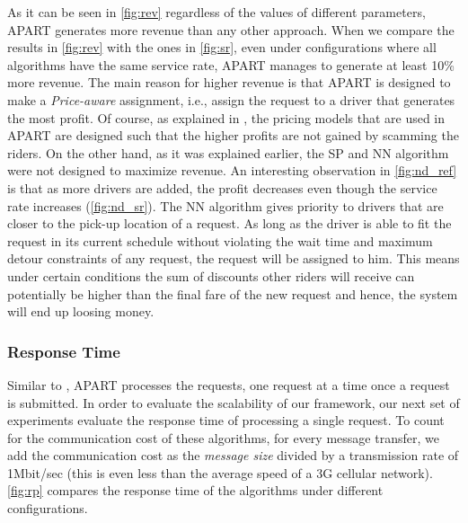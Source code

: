 As it can be seen in \cref{fig:rev} regardless of the values of different parameters, APART generates more revenue than any other approach. When we compare the results in \cref{fig:rev} with the ones in \cref{fig:sr}, even under configurations where all algorithms have the same service rate, APART manages to generate at least 10\% more revenue. The main reason for higher revenue is that APART is designed to make a \textit{Price-aware} assignment, i.e., assign the request to a driver that generates the most profit. Of course, as explained in , the pricing models that are used in APART are designed such that the higher profits are not gained by scamming the riders. On the other hand, as it was explained earlier, the SP and NN algorithm were not designed to maximize revenue. An interesting observation in \cref{fig:nd_ref} is that as more drivers are added, the profit decreases even though the service rate increases (\cref{fig:nd_sr}). The NN algorithm gives priority to drivers that are closer to the pick-up location of a request. As long as the driver is able to fit the request in its current schedule without violating the wait time and maximum detour constraints of any request, the request will be assigned to him. This means under certain conditions the sum of discounts other riders will receive can potentially be higher than the final fare of the new request and hence, the system will end up loosing money.

\subsubsection{Response Time}

Similar to \cite{Ma13,Huang14}, APART processes the requests, one request at a time once a request is submitted. In order to evaluate the scalability of our framework, our next set of experiments evaluate the response time of processing a single request. To count for the communication cost of these algorithms, for every message transfer, we add the communication cost as the \textit{message size} divided by a transmission rate of 1Mbit/sec (this is even less than the average speed of a 3G cellular network). \cref{fig:rp} compares the response time of the algorithms under different configurations.

